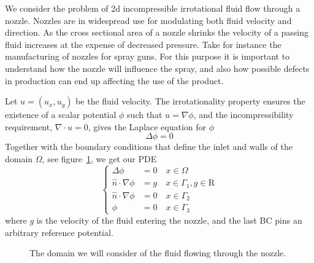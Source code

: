 \documentclass{article}
\begin{document}
We consider the problem of 2d incompressible irrotational fluid flow
through a nozzle.
Nozzles are in widespread use for modulating both
fluid velocity and direction.
As the cross sectional area of a nozzle shrinks
the velocity of a passing fluid increases
at the expense of decreased pressure.
Take for instance the manufacturing of nozzles for spray guns.
For this purpose it is important to understand how the nozzle
will influence the spray,
and also how possible defects in production can
end up affecting the use of the product.

Let $u=(u_x, u_y)$ be the fluid velocity.
The irrotationality property ensures the existence of a
scalar potential $\phi$ such that $u = \nabla\phi$,
and the incompressibility requirement, $\nabla \cdot u = 0$,
gives the Laplace equation for $\phi$
$$ \Delta\phi = 0 $$
Together with the boundary conditions that define the inlet and walls
of the domain $\Omega$, see figure~\ref{fig:domain},
we get our PDE
\begin{equation*}
  \left\{ \begin{aligned}
    \Delta\phi &= 0 \quad x \in \Omega \\
    \hat n \cdot \nabla\phi &= g \quad x \in \Gamma_1, g \in \mathrm R \\
    \hat n \cdot \nabla\phi &= 0 \quad x \in \Gamma_2 \\
    \phi &= 0 \quad x \in \Gamma_3
    \end{aligned} \right.
\end{equation*}
where $g$ is the velocity of the fluid entering the nozzle,
and the last BC pins an arbitrary reference potential.

\begin{figure}
  \centering
  \def\svgwidth{0.6\linewidth}
  
  \caption{The domain we will consider of the fluid flowing through the nozzle. \label{fig:domain}}
\end{figure}
\end{document}
